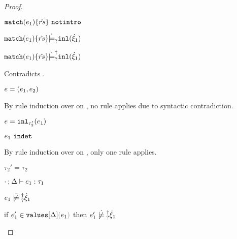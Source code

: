 \begin{proof}
\begin{byCases}
\begin{byCases}
\begin{byCases}
\begin{pfsteps*}
          \item $\mathtt{match}(e_1) \{\hat{rs}\} ~\mathtt{notintro}$  
          \item $\mathtt{match}(e_1) \{\hat{rs}\} \dot{\models}_{?} \mathtt{inl}(\dot{\xi}_1)$  
          \item $\mathtt{match}(e_1) \{\hat{rs}\} \dot{\models}_{?}^{\dag} \mathtt{inl}(\dot{\xi}_1)$ 
          \end{pfsteps*} 
          Contradicts .
          \item[\text{(\ref{rule:IPairL}), (\ref{rule:IPairR}), (\ref{rule:IPair})}] 
          \begin{pfsteps*}
          \item $e=(e_1 , e_2)$ 
          \end{pfsteps*} 
          By rule induction over  on , no rule applies due to syntactic contradiction.
          \item[\text{(\ref{rule:IInl})}] 
          \begin{pfsteps*}
          \item $e=\mathtt{inl}_{\tau_2'}({e_1})$ 
          \item $e_1 ~\mathtt{indet}$  
          \end{pfsteps*} 
          By rule induction over  on , only one rule applies.
          \begin{byCases}
            \item[\text{(\ref{rule:TInl})}]
            \begin{pfsteps*}
            \item $\tau_2'=\tau_2$ 
            \item $\cdot \mathbin{;} \Delta \vdash e_1 : \tau_1$  
            \item $\cnotsatisfyormay{e_1}{\hxi_1}$  
            \item if $\inValues{e_1'}{\Delta}{e_1}$ then $\cnotsatisfyormay{e_1'}{\hxi_1}$  
            \end{pfsteps*} 

\end{byCases}
\end{byCases}
\end{byCases}
\end{byCases}
\end{proof}
